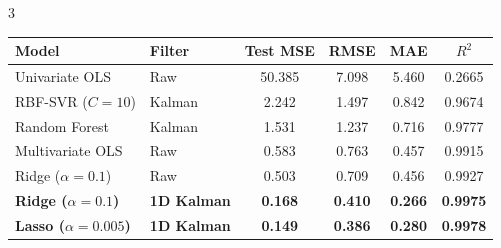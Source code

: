 \documentclass[10pt,landscape]{article}
\begin{document}
\begin{multicols}{3}
\begin{center}
\small
\begin{tabular}{llcccc}
\toprule
\textbf{Model} & \textbf{Filter} & \textbf{Test MSE} & \textbf{RMSE} & \textbf{MAE} & \textbf{$R^2$} \\
\midrule
Univariate OLS & Raw & 50.385 & 7.098 & 5.460 & 0.2665 \\
RBF-SVR ($C=10$) & Kalman & 2.242 & 1.497 & 0.842 & 0.9674 \\
Random Forest & Kalman & 1.531 & 1.237 & 0.716 & 0.9777 \\
Multivariate OLS & Raw & 0.583 & 0.763 & 0.457 & 0.9915 \\
Ridge ($\alpha=0.1$) & Raw & 0.503 & 0.709 & 0.456 & 0.9927 \\
\textbf{Ridge ($\alpha=0.1$)} & \textbf{1D Kalman} & \textbf{0.168} & \textbf{0.410} & \textbf{0.266} & \textbf{0.9975} \\
\textbf{Lasso ($\alpha=0.005$)} & \textbf{1D Kalman} & \textbf{0.149} & \textbf{0.386} & \textbf{0.280} & \textbf{0.9978} \\
\bottomrule
\end{tabular}
\end{center}

\end{multicols}
\end{document}
